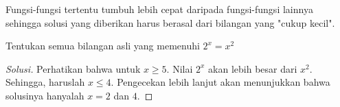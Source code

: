 \documentclass[11pt]{scrartcl}
\begin{document}
Fungsi-fungsi tertentu tumbuh lebih cepat daripada fungsi-fungsi lainnya sehingga solusi yang diberikan harus berasal dari bilangan yang "cukup kecil".

\begin{example}
    Tentukan semua bilangan asli yang memenuhi $2^x = x^2$
\end{example}

\begin{proof}[Solusi]
    Perhatikan bahwa untuk $x \geq 5$. Nilai $2^x$ akan lebih besar dari $x^2$. Sehingga, haruslah $x \leq 4$. Pengecekan lebih lanjut akan menunjukkan bahwa solusinya hanyalah $x = 2$ dan $4$.
\end{proof}



\end{document}
